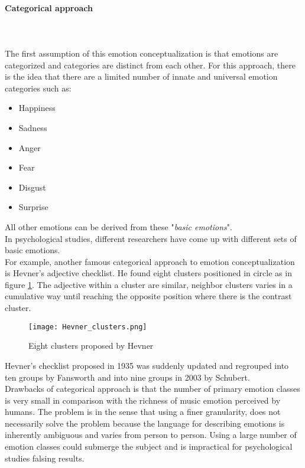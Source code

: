 \paragraph{Categorical approach}
\mbox{} \\ \\ \indent
The first assumption of this emotion conceptualization is that emotions are categorized and categories are distinct from each other. For this approach, there is the idea that there are a limited number of innate and universal emotion categories such as:
\begin{itemize}
	\item Happiness
	\item Sadness
	\item Anger
	\item Fear
	\item Disgust
	\item Surprise
\end{itemize}
All other emotions can be derived from these "\textit{basic emotions}".
\\
In psychological studies, different researchers have come up with different sets of basic emotions.
\\
For example, another famous categorical approach to emotion conceptualization is Hevner's adjective checklist. He found eight clusters positioned in circle as in figure \ref{fig:Hevner_clusters}. The adjective within a cluster are similar, neighbor clusters varies in a cumulative way until reaching the opposite position where there is the contrast cluster. 
\begin{figure}[h]
    \centering
    \texttt{[image: Hevner\_clusters.png]} 
	\caption{Eight clusters proposed by Hevner}
    \label{fig:Hevner_clusters}
\end{figure}
Hevner's checklist proposed in 1935 was suddenly updated and regrouped into ten groups by Fansworth and into nine groups in 2003 by Schubert.
\\ \indent
Drawbacks of categorical approach is that the number of primary emotion classes is very small in comparison with the richness of music emotion perceived by humans. The problem is in the sense that using a finer granularity, does not necessarily solve the problem because the language for describing emotions is inherently ambiguous and varies from person to person. Using a large number of emotion classes could submerge the subject and is impractical for psychological studies falsing results.

